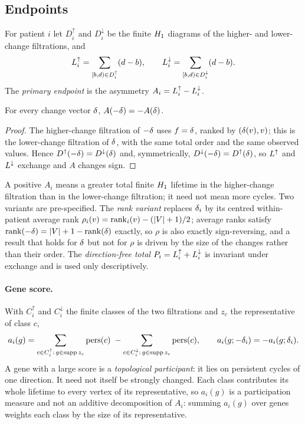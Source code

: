 \subsection{Endpoints}\label{sec:endpoints}
For patient $i$ let $D^{\uparrow}_i$ and $D^{\downarrow}_i$ be the finite $H_{1}$ diagrams of the higher- and lower-change filtrations, and
\begin{equation}
L^{\uparrow}_i=\sum_{[b,d)\in D^{\uparrow}_i}(d-b),\qquad L^{\downarrow}_i=\sum_{[b,d)\in D^{\downarrow}_i}(d-b).
\end{equation}
The \emph{primary endpoint} is the asymmetry $A_i=L^{\uparrow}_i-L^{\downarrow}_i$.

\begin{proposition}\label{prop:antisym}
For every change vector $\delta$, $A(-\delta)=-A(\delta)$.
\end{proposition}
\begin{proof}
The higher-change filtration of $-\delta$ uses $f=\delta$, ranked by $(\delta(v),v)$; this is the lower-change filtration of $\delta$, with the same total order and the same observed values. Hence $D^{\uparrow}(-\delta)=D^{\downarrow}(\delta)$ and, symmetrically, $D^{\downarrow}(-\delta)=D^{\uparrow}(\delta)$, so $L^{\uparrow}$ and $L^{\downarrow}$ exchange and $A$ changes sign.
\end{proof}

A positive $A_i$ means a greater total finite $H_{1}$ lifetime in the higher-change filtration than in the lower-change filtration; it need not mean more cycles. Two variants are pre-specified. The \emph{rank variant} replaces $\delta_i$ by its centred within-patient average rank $\rho_i(v)=\operatorname{rank}_i(v)-(|V|+1)/2$; average ranks satisfy $\operatorname{rank}(-\delta)=|V|+1-\operatorname{rank}(\delta)$ exactly, so $\rho$ is also exactly sign-reversing, and a result that holds for $\delta$ but not for $\rho$ is driven by the size of the changes rather than their order. The \emph{direction-free total} $P_i=L^{\uparrow}_i+L^{\downarrow}_i$ is invariant under exchange and is used only descriptively.

\paragraph{Gene score.} With $C^{\uparrow}_i$ and $C^{\downarrow}_i$ the finite classes of the two filtrations and $z_c$ the representative of class $c$,
\begin{equation}
a_i(g)=\sum_{c\in C^{\uparrow}_i:\,g\in\operatorname{supp} z_c}\operatorname{pers}(c)\;-\sum_{c\in C^{\downarrow}_i:\,g\in\operatorname{supp} z_c}\operatorname{pers}(c),\qquad a_i(g;-\delta_i)=-a_i(g;\delta_i).
\end{equation}
A gene with a large score is a \emph{topological participant}: it lies on persistent cycles of one direction. It need not itself be strongly changed. Each class contributes its whole lifetime to every vertex of its representative, so $a_i(g)$ is a participation measure and not an additive decomposition of $A_i$: summing $a_i(g)$ over genes weights each class by the size of its representative.

